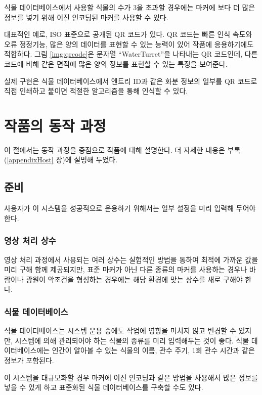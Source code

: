 \documentclass[chapter,11pt,oneside,openany]{xoblivoir}
\begin{document}
식물 데이터베이스에서 사용할 식물의 수가 3을 초과할 경우에는 마커에 보다 더 많은
정보를 넣기 위해 이진 인코딩된 마커를 사용할 수 있다.

대표적인 예로, ISO 표준으로 공개된 QR 코드가 있다. QR 코드는 빠른 인식 속도와 오류 정정기능,
많은 양의 데이터를 표현할 수 있는 능력이 있어 작품에 응용하기에도 적합하다.
그림 \ref{img:qrcode}은 문자열 ``WaterTurret''을 나타내는 QR 코드인데,
다른 코드에 비해 같은 면적에 많은 양의 정보를 표현할 수 있는 특징을 보여준다.

실제 구현은 식물 데이터베이스에서 엔트리 ID과 같은 화분 정보의 일부를 QR 코드로 직접 인쇄하고 붙이면
적절한 알고리즘을 통해 인식할 수 있다.



\section{작품의 동작 과정}

이 절에서는 동작 과정을 중점으로 작품에 대해 설명한다.
더 자세한 내용은 부록(\ref{appendixHost} 장)에 설명해 두었다.

\subsection{준비}
사용자가 이 시스템을 성공적으로 운용하기 위해서는 일부 설정을 미리 입력해 두어야 한다.

\subsubsection{영상 처리 상수}
영상 처리 과정에서 사용되는 여러 상수는 실험적인 방법을 통하여 최적에 가까운 값을 미리 구해 함께 제공되지만,
표준 마커가 아닌 다른 종류의 마커를 사용하는 경우나 바람이나 광원이 악조건을 형성하는 경우에는
해당 환경에 맞는 상수를 새로 구해야 한다.

\subsubsection{식물 데이터베이스}
식물 데이터베이스는 시스템 운용 중에도 작업에 영향을 미치지 않고 변경할 수 있지만,
시스템에 의해 관리되어야 하는 식물의 종류를 미리 입력해두는 것이 좋다.
식물 데이터베이스에는 인간이 알아볼 수 있는 식물의 이름, 관수 주기, 1회 관수 시간과 같은 정보가 포함된다.

이 시스템을 대규모화할 경우 마커에 이진 인코딩과 같은 방법을 사용해서 많은 정보를 넣을 수 있게 하고
표준화된 식물 데이터베이스를 구축할 수도 있다.
\end{document}

